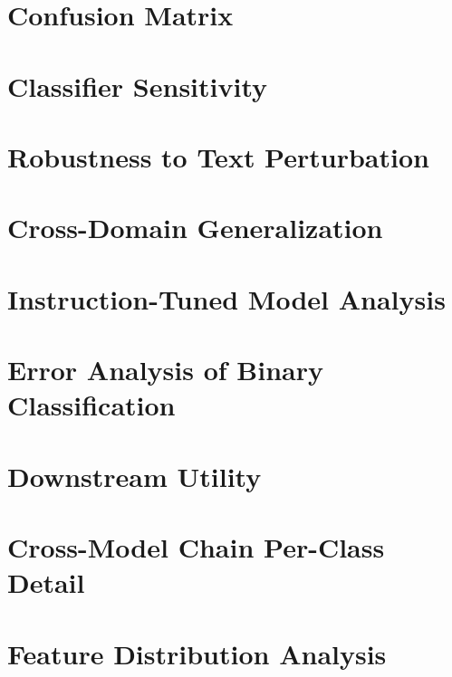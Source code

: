 \documentclass[11pt]{article}
\begin{document}
\section{Confusion Matrix}
\label{app:confusion}

\FloatBarrier

\section{Classifier Sensitivity}
\label{app:classifier}

\FloatBarrier

\section{Robustness to Text Perturbation}
\label{app:human-edit}

\FloatBarrier

\section{Cross-Domain Generalization}
\label{app:domain}

\FloatBarrier

\section{Instruction-Tuned Model Analysis}
\label{app:instruct}


\section{Error Analysis of Binary Classification}
\label{app:error-analysis}

\FloatBarrier


\section{Downstream Utility}
\label{app:downstream}

\FloatBarrier

\section{Cross-Model Chain Per-Class Detail}
\label{app:cross-model-detail}

\FloatBarrier

\section{Feature Distribution Analysis}
\label{app:feature-distributions}

\end{document}
